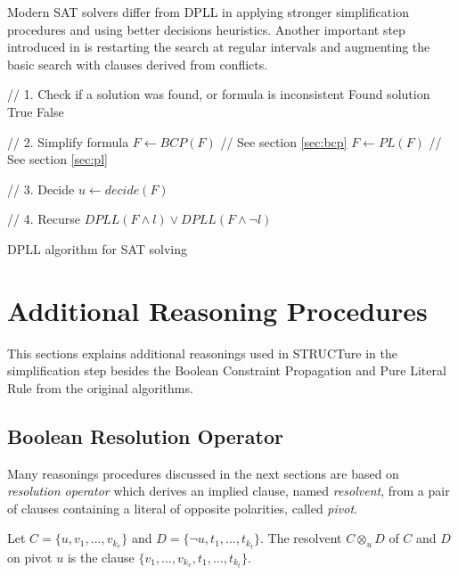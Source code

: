 Modern SAT solvers differ from DPLL in applying
stronger simplification procedures and using better
decisions heuristics. Another important step introduced in
\cite{Marques-silva99grasp:a} is restarting the search at regular
intervals and augmenting the basic search with clauses derived
from conflicts.


\begin{algorithm}
  \begin{algorithmic}

    // 1. Check if a solution was found, or formula is inconsistent
      \PRINT Found solution
      \RETURN True
    \ENDIF
      \RETURN False
    \ENDIF

    // 2. Simplify formula
    \STATE $F \gets BCP(F)$ // See section \ref{sec:bcp}
    \STATE $F \gets PL(F)$  // See section \ref{sec:pl}

    // 3. Decide
    \STATE $u \gets decide(F)$

    // 4. Recurse
    \RETURN $DPLL(F \land l) \lor DPLL(F \land \neg l)$
  \end{algorithmic}

  \caption{DPLL algorithm for SAT solving}
  \label{alg:dpll}
\end{algorithm}


\section{Additional Reasoning Procedures}

This sections explains additional reasonings used in STRUCTure in
the simplification step besides the Boolean Constraint Propagation
and Pure Literal Rule from the original algorithms.

\subsection{Boolean Resolution Operator}
\label{ssec:resolution}

Many reasonings procedures discussed in the next sections are based
on \emph{resolution operator} \cite{Robinson:1965:MLB:321250.321253}
which derives an implied clause, named \emph{resolvent}, from
a pair of clauses containing a literal of opposite polarities,
called \emph{pivot}.

\begin{mydef}
  \label{mydef:resolution}
  Let $C = \{ u, v_1, \ldots, v_{k_v} \}$ and $D = \{ \neg u,
  t_1, \ldots, t_{k_t} \}$. The resolvent $C \otimes_{u} D$ of $C$
  and $D$ on pivot $u$ is the clause $\{v_1, \ldots, v_{k_v}, t_1,
  \ldots, t_{k_t}\}$.
\end{mydef}


